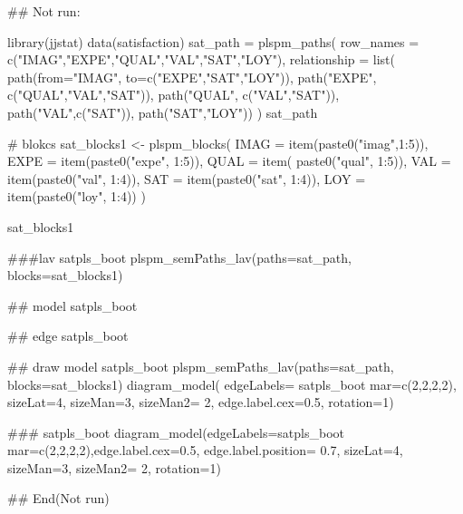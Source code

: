 \documentclass[a4paper]{book}
\begin{document}
\begin{Examples}
\begin{ExampleCode}

\#\# Not run: 

library(jjstat)
data(satisfaction)
sat_path = plspm_paths(
  row_names = c("IMAG","EXPE","QUAL","VAL","SAT","LOY"),
  relationship = list(
    path(from="IMAG", to=c("EXPE","SAT","LOY")),
    path("EXPE", c("QUAL","VAL","SAT")),
    path("QUAL", c("VAL","SAT")),
    path("VAL",c("SAT")),
    path("SAT","LOY"))
)
sat_path

# blokcs
sat_blocks1 <- plspm_blocks(
  IMAG = item(paste0("imag",1:5)),
  EXPE = item(paste0("expe", 1:5)),
  QUAL = item( paste0("qual", 1:5)),
  VAL = item(paste0("val", 1:4)),
  SAT = item(paste0("sat", 1:4)),
  LOY = item(paste0("loy", 1:4))
)

sat_blocks1


###lav
satpls_boot%
  plspm_semPaths_lav(paths=sat_path, blocks=sat_blocks1)%

## model
satpls_boot%

## edge
satpls_boot%

## draw model
satpls_boot%
  plspm_semPaths_lav(paths=sat_path, blocks=sat_blocks1)%
  diagram_model(  edgeLabels= satpls_boot%
                  mar=c(2,2,2,2),
                  sizeLat=4, sizeMan=3, sizeMan2= 2, edge.label.cex=0.5, rotation=1)

###
satpls_boot%
  diagram_model(edgeLabels=satpls_boot%
                mar=c(2,2,2,2),edge.label.cex=0.5, edge.label.position= 0.7,
                sizeLat=4, sizeMan=3, sizeMan2= 2, rotation=1)


## End(Not run)


\end{ExampleCode}
\end{Examples}
\end{document}
